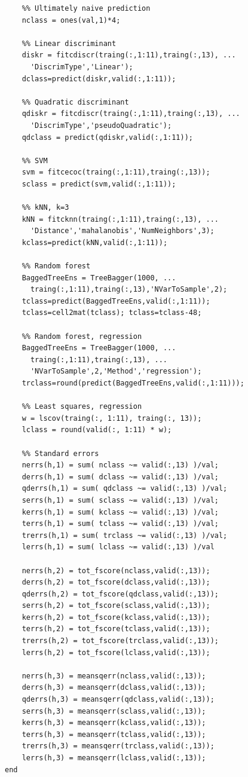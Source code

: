 \documentclass[twoside]{article}
\begin{document}
\begin{multicols}{2}
{\begin{verbatim}
    %% Ultimately naive prediction
    nclass = ones(val,1)*4;
    
    %% Linear discriminant
    diskr = fitcdiscr(traing(:,1:11),traing(:,13), ...
      'DiscrimType','Linear');
    dclass=predict(diskr,valid(:,1:11));

    %% Quadratic discriminant
    qdiskr = fitcdiscr(traing(:,1:11),traing(:,13), ...
      'DiscrimType','pseudoQuadratic');
    qdclass = predict(qdiskr,valid(:,1:11));
    
    %% SVM
    svm = fitcecoc(traing(:,1:11),traing(:,13));
    sclass = predict(svm,valid(:,1:11));
    
    %% kNN, k=3
    kNN = fitcknn(traing(:,1:11),traing(:,13), ...
      'Distance','mahalanobis','NumNeighbors',3);
    kclass=predict(kNN,valid(:,1:11));

    %% Random forest
    BaggedTreeEns = TreeBagger(1000, ...
      traing(:,1:11),traing(:,13),'NVarToSample',2);
    tclass=predict(BaggedTreeEns,valid(:,1:11));
    tclass=cell2mat(tclass); tclass=tclass-48;

    %% Random forest, regression
    BaggedTreeEns = TreeBagger(1000, ...
      traing(:,1:11),traing(:,13), ...
      'NVarToSample',2,'Method','regression');    
    trclass=round(predict(BaggedTreeEns,valid(:,1:11)));
        
    %% Least squares, regression
    w = lscov(traing(:, 1:11), traing(:, 13));
    lclass = round(valid(:, 1:11) * w);

    %% Standard errors
    nerrs(h,1) = sum( nclass ~= valid(:,13) )/val;
    derrs(h,1) = sum( dclass ~= valid(:,13) )/val;
    qderrs(h,1) = sum( qdclass ~= valid(:,13) )/val;
    serrs(h,1) = sum( sclass ~= valid(:,13) )/val;
    kerrs(h,1) = sum( kclass ~= valid(:,13) )/val;
    terrs(h,1) = sum( tclass ~= valid(:,13) )/val;
    trerrs(h,1) = sum( trclass ~= valid(:,13) )/val;
    lerrs(h,1) = sum( lclass ~= valid(:,13) )/val

    nerrs(h,2) = tot_fscore(nclass,valid(:,13));
    derrs(h,2) = tot_fscore(dclass,valid(:,13));
    qderrs(h,2) = tot_fscore(qdclass,valid(:,13));
    serrs(h,2) = tot_fscore(sclass,valid(:,13));
    kerrs(h,2) = tot_fscore(kclass,valid(:,13));
    terrs(h,2) = tot_fscore(tclass,valid(:,13));
    trerrs(h,2) = tot_fscore(trclass,valid(:,13));
    lerrs(h,2) = tot_fscore(lclass,valid(:,13));

    nerrs(h,3) = meansqerr(nclass,valid(:,13));
    derrs(h,3) = meansqerr(dclass,valid(:,13));
    qderrs(h,3) = meansqerr(qdclass,valid(:,13));
    serrs(h,3) = meansqerr(sclass,valid(:,13));
    kerrs(h,3) = meansqerr(kclass,valid(:,13));
    terrs(h,3) = meansqerr(tclass,valid(:,13));
    trerrs(h,3) = meansqerr(trclass,valid(:,13));
    lerrs(h,3) = meansqerr(lclass,valid(:,13));
end

\end{verbatim}

}

\end{multicols}
\end{document}
